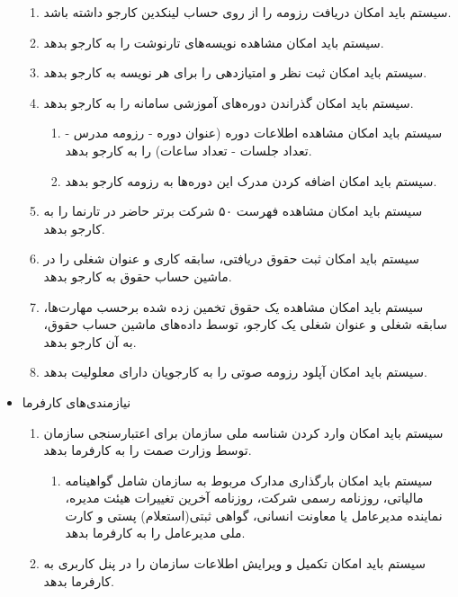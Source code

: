 \documentclass[12pt]{article}
\begin{document}
\begin{itemize}
\begin{enumerate}
			\item سیستم باید امکان دریافت رزومه را از روی حساب لینکدین کارجو داشته باشد.
			\item سیستم باید امکان مشاهده نویسه‌های تارنوشت را به کارجو بدهد.
			\item سیستم باید امکان ثبت نظر و امتیازدهی را برای هر نویسه به کارجو بدهد.
			\item سیستم باید امکان گذراندن دوره‌های آموزشی سامانه را به کارجو بدهد.
			\begin{enumerate}
				\renewcommand{\labelenumii}{-R\arabic{enumi}.\arabic{enumii}}
				\item سیستم باید امکان مشاهده اطلاعات دوره (عنوان دوره - رزومه مدرس - تعداد جلسات - تعداد ساعات) را به کارجو بدهد.
				\item سیستم باید امکان اضافه کردن مدرک این دوره‌ها به رزومه کارجو بدهد.
			\end{enumerate}
			\item سیستم باید امکان مشاهده فهرست ۵۰ شرکت برتر حاضر در تارنما را به کارجو بدهد.
			\item سیستم باید امکان ثبت حقوق دریافتی، سابقه کاری و عنوان شغلی را در ماشین حساب حقوق به کارجو بدهد.
			\item سیستم باید امکان مشاهده یک حقوق تخمین زده شده برحسب مهارت‌ها، سابقه شغلی و عنوان شغلی یک کارجو، توسط داده‌های ماشین حساب حقوق، به آن کارجو بدهد.
			\item سیستم باید امکان آپلود رزومه صوتی را به کارجویان دارای معلولیت بدهد.
		\end{enumerate}
		\item
		نیازمندی‌های کارفرما
		\begin{enumerate}
			\renewcommand{\labelenumi}{-R\arabic{enumi}}
			\setcounter{enumi}{65}
			\item سیستم باید امکان وارد کردن شناسه ملی سازمان برای اعتبارسنجی سازمان توسط وزارت صمت را به کارفرما بدهد.
			\begin{enumerate}
				\renewcommand{\labelenumii}{-R\arabic{enumi}.\arabic{enumii}}
				\item سیستم باید امکان بارگذاری مدارک مربوط به سازمان شامل گواهینامه مالیاتی، روزنامه رسمی شرکت، روزنامه آخرین تغییرات هیئت مدیره، نماینده مدیرعامل یا معاونت انسانی، گواهی ثبتی(استعلام) پستی و کارت ملی مدیرعامل را به کارفرما بدهد.
			\end{enumerate}
			\item سیستم باید امکان تکمیل و ویرایش اطلاعات سازمان را در پنل کاربری به کارفرما بدهد.
			\begin{enumerate}
				\renewcommand{\labelenumii}{-R\arabic{enumi}.\arabic{enumii}}

\end{enumerate}
\end{enumerate}
\end{itemize}
\end{document}
